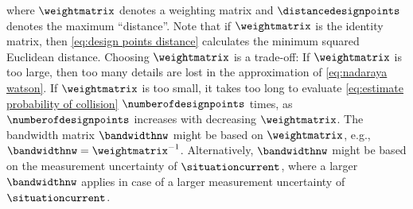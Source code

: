 where $\weightmatrix$ denotes a weighting matrix and $\distancedesignpoints$ denotes the maximum ``distance''. 
Note that if $\weightmatrix$ is the identity matrix, then \cref{eq:design points distance} calculates the minimum squared Euclidean distance.
\cstarta Choosing $\weightmatrix$ is a trade-off: If $\weightmatrix$ is too large, then too many details are lost in the approximation of \cref{eq:nadaraya watson}.
If $\weightmatrix$ is too small, it takes too long to evaluate \cref{eq:estimate probability of collision} $\numberofdesignpoints$ times, as $\numberofdesignpoints$ increases with decreasing $\weightmatrix$. \cenda
The bandwidth matrix $\bandwidthnw$ might be based on $\weightmatrix$, e.g., $\bandwidthnw=\weightmatrix^{-1}$.
Alternatively, $\bandwidthnw$ might be based on the measurement uncertainty of $\situationcurrent$, where a larger $\bandwidthnw$ applies in case of a larger measurement uncertainty of $\situationcurrent$.


